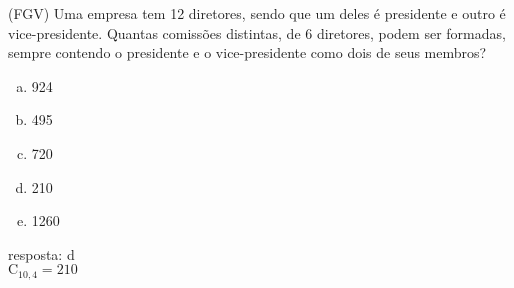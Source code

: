 \begin{ex}
 (FGV) Uma empresa tem 12 diretores, sendo que um deles é presidente e outro é vice-presidente. Quantas comissões distintas, de 6 diretores, podem ser formadas, sempre contendo o presidente e o vice-presidente como dois de seus membros?
    \begin{enumerate}[(a)]
    \item 924
    \item 495
    \item 720
    \item 210
    \item 1260
    \end{enumerate}
      \begin{sol}
       resposta: d \\
      $\mathrm{C}_{{10},4}=210$
      \end{sol}
\end{ex}